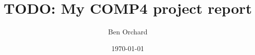 



\title{TODO: My COMP4 project report}
\author{Ben Orchard}

\date{\today}

\maketitle

\clearpage
\tableofcontents
\clearpage



